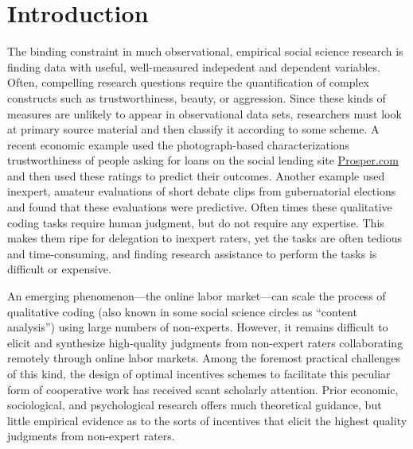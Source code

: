 \documentclass{chi2009}
\begin{document}


\section{Introduction}
The binding constraint in much observational, empirical social
science research is finding data with useful, well-measured indepedent
and dependent variables. Often, compelling research questions require the quantification of complex constructs such as trustworthiness, beauty, or aggression. Since these kinds of measures are unlikely to appear in observational data sets, researchers must look at primary source material and then classify it according to some scheme. A recent economic
  example used the photograph-based characterizations trustworthiness
  of people asking for loans on the social lending site
  \href{http://www.prosper.com}{Prosper.com} and then used these
  ratings to predict their outcomes\cite{duarte2009tc}. Another
  example used inexpert, amateur evaluations of short debate clips
  from gubernatorial elections and found that these evaluations were
  predictive\cite{benjamin2009}. Often times these qualitative coding tasks require human judgment, but do not require any expertise. This makes them ripe for delegation to inexpert raters, yet the tasks are often tedious and time-consuming, and finding research assistance to perform the tasks is difficult or expensive. 

An emerging phenomenon---the online labor market---can scale the process of qualitative coding (also known in some social science circles as ``content analysis'') using large numbers of non-experts. However, it remains difficult to elicit and synthesize high-quality judgments from non-expert raters collaborating remotely through online labor markets. Among the foremost practical challenges of this kind, the design of optimal incentives schemes to facilitate this peculiar form of cooperative work has received scant scholarly attention. Prior economic, sociological, and psychological research offers much theoretical guidance, but little empirical evidence as to the sorts of incentives that elicit the highest quality judgments from non-expert raters. 
\end{document}

